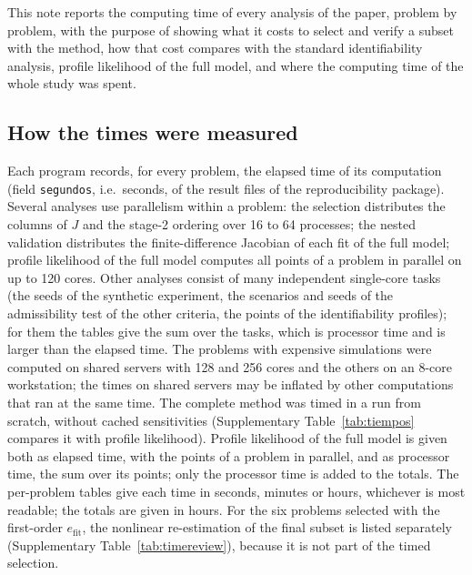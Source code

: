 

This note reports the computing time of every analysis of the paper, problem by problem, with the purpose of showing what it costs to select and verify a subset with the method, how that cost compares with the standard identifiability analysis, profile likelihood of the full model, and where the computing time of the whole study was spent.

\subsection*{How the times were measured}
Each program records, for every problem, the elapsed time of its computation (field \texttt{segundos}, i.e.\ seconds, of the result files of the reproducibility package). Several analyses use parallelism within a problem: the selection distributes the columns of $J$ and the stage-2 ordering over 16 to 64 processes; the nested validation distributes the finite-difference Jacobian of each fit of the full model; profile likelihood of the full model computes all points of a problem in parallel on up to 120 cores. Other analyses consist of many independent single-core tasks (the seeds of the synthetic experiment, the scenarios and seeds of the admissibility test of the other criteria, the points of the identifiability profiles); for them the tables give the sum over the tasks, which is processor time and is larger than the elapsed time. The problems with expensive simulations were computed on shared servers with 128 and 256 cores and the others on an 8-core workstation; the times on shared servers may be inflated by other computations that ran at the same time. The complete method was timed in a run from scratch, without cached sensitivities (Supplementary Table~\ref{tab:tiempos} compares it with profile likelihood). Profile likelihood of the full model is given both as elapsed time, with the points of a problem in parallel, and as processor time, the sum over its points; only the processor time is added to the totals. The per-problem tables give each time in seconds, minutes or hours, whichever is most readable; the totals are given in hours. For the six problems selected with the first-order $e_{\mathrm{fit}}$, the nonlinear re-estimation of the final subset is listed separately (Supplementary Table~\ref{tab:timereview}), because it is not part of the timed selection.

